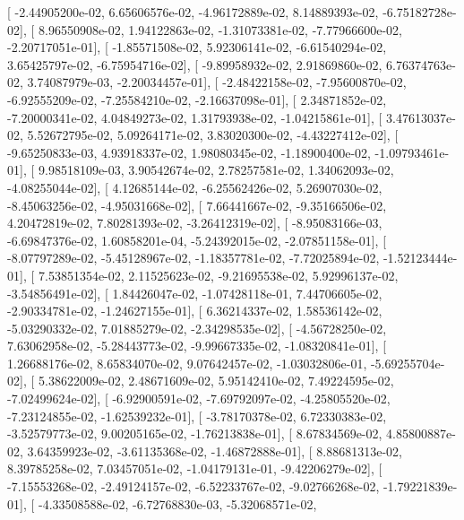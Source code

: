 \documentclass{article}
\begin{document}
       [ -2.44905200e-02,   6.65606576e-02,  -4.96172889e-02,
          8.14889393e-02,  -6.75182728e-02],
       [  8.96550908e-02,   1.94122863e-02,  -1.31073381e-02,
         -7.77966600e-02,  -2.20717051e-01],
       [ -1.85571508e-02,   5.92306141e-02,  -6.61540294e-02,
          3.65425797e-02,  -6.75954716e-02],
       [ -9.89958932e-02,   2.91869860e-02,   6.76374763e-02,
          3.74087979e-03,  -2.20034457e-01],
       [ -2.48422158e-02,  -7.95600870e-02,  -6.92555209e-02,
         -7.25584210e-02,  -2.16637098e-01],
       [  2.34871852e-02,  -7.20000341e-02,   4.04849273e-02,
          1.31793938e-02,  -1.04215861e-01],
       [  3.47613037e-02,   5.52672795e-02,   5.09264171e-02,
          3.83020300e-02,  -4.43227412e-02],
       [ -9.65250833e-03,   4.93918337e-02,   1.98080345e-02,
         -1.18900400e-02,  -1.09793461e-01],
       [  9.98518109e-03,   3.90542674e-02,   2.78257581e-02,
          1.34062093e-02,  -4.08255044e-02],
       [  4.12685144e-02,  -6.25562426e-02,   5.26907030e-02,
         -8.45063256e-02,  -4.95031668e-02],
       [  7.66441667e-02,  -9.35166506e-02,   4.20472819e-02,
          7.80281393e-02,  -3.26412319e-02],
       [ -8.95083166e-03,  -6.69847376e-02,   1.60858201e-04,
         -5.24392015e-02,  -2.07851158e-01],
       [ -8.07797289e-02,  -5.45128967e-02,  -1.18357781e-02,
         -7.72025894e-02,  -1.52123444e-01],
       [  7.53851354e-02,   2.11525623e-02,  -9.21695538e-02,
          5.92996137e-02,  -3.54856491e-02],
       [  1.84426047e-02,  -1.07428118e-01,   7.44706605e-02,
         -2.90334781e-02,  -1.24627155e-01],
       [  6.36214337e-02,   1.58536142e-02,  -5.03290332e-02,
          7.01885279e-02,  -2.34298535e-02],
       [ -4.56728250e-02,   7.63062958e-02,  -5.28443773e-02,
         -9.99667335e-02,  -1.08320841e-01],
       [  1.26688176e-02,   8.65834070e-02,   9.07642457e-02,
         -1.03032806e-01,  -5.69255704e-02],
       [  5.38622009e-02,   2.48671609e-02,   5.95142410e-02,
          7.49224595e-02,  -7.02499624e-02],
       [ -6.92900591e-02,  -7.69792097e-02,  -4.25805520e-02,
         -7.23124855e-02,  -1.62539232e-01],
       [ -3.78170378e-02,   6.72330383e-02,  -3.52579773e-02,
          9.00205165e-02,  -1.76213838e-01],
       [  8.67834569e-02,   4.85800887e-02,   3.64359923e-02,
         -3.61135368e-02,  -1.46872888e-01],
       [  8.88681313e-02,   8.39785258e-02,   7.03457051e-02,
         -1.04179131e-01,  -9.42206279e-02],
       [ -7.15553268e-02,  -2.49124157e-02,  -6.52233767e-02,
         -9.02766268e-02,  -1.79221839e-01],
       [ -4.33508588e-02,  -6.72768830e-03,  -5.32068571e-02,
\end{document}
